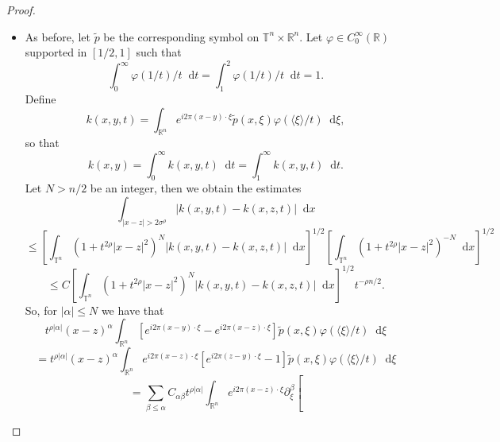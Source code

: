 \documentclass[10pt,a4paper]{amsart}
\newcommand*\diff{\mathop{}\!\mathrm{d}}
\begin{document}
\begin{proof}
\begin{itemize}
        \item[(b)] As before, let $\tilde{p}$ be the corresponding symbol on $\mathbb{T}^n \times \mathbb{R}^n$.  Let $\varphi \in C_0^\infty(\mathbb{R})$ supported in $[1/2, 1]$ such that 
        \begin{equation*}
            \int_0^\infty\varphi(1/t)/t \diff t =\int_1^2\varphi(1/t)/t \diff t = 1.
        \end{equation*} 
        Define 
        \begin{equation*}
            k(x, y, t) = \int_{\mathbb{R}^n} e^{i2\pi(x - y) \cdot \xi} \tilde{p}(x, \xi) \varphi(\langle\xi\rangle/t) \diff \xi,
        \end{equation*}
        so that  
        \begin{equation*}
            k(x, y) = \int_0^\infty k(x, y, t) \diff t = \int_1^\infty k(x, y, t) \diff t.
        \end{equation*}
        Let $N > n/2$ be an integer, then we obtain the estimates
        \begin{equation*}
            \int_{|x-z|>2\sigma^\rho} |k(x, y, t) - k(x, z, t)| \diff x
        \end{equation*}
        \begin{equation*}
            \leq  \left[ \int_{\mathbb{T}^n} (1+t^{2\rho}|x-z|^2)^N |k(x, y, t) - k(x, z, t)| \diff x  \right]^{1/2} \left[ \int_{\mathbb{T}^n} (1+t^{2\rho}|x-z|^2)^{-N} \diff x \right]^{1/2} 
        \end{equation*}
        \begin{equation}
            \leq C\left[ \int_{\mathbb{T}^n} (1+t^{2\rho}|x-z|^2)^N |k(x, y, t) - k(x, z, t)| \diff x  \right]^{1/2}t^{-\rho n/2}.
            \label{eq:firstbound-b}
        \end{equation}
        So, for $|\alpha| \leq N$ we have that
        \begin{equation*}
            t^{\rho|\alpha|}(x-z)^\alpha \int_{\mathbb{R}^n} \left[ e^{i2\pi(x - y) \cdot \xi} - e^{i2\pi(x - z) \cdot \xi} \right]\tilde{p}(x, \xi)\varphi(\langle\xi\rangle/t)\diff \xi 
        \end{equation*}
        \begin{equation*}
            =t^{\rho|\alpha|}(x-z)^\alpha \int_{\mathbb{R}^n} e^{i2\pi(x - z) \cdot \xi} \left[ e^{i2\pi(z - y) \cdot \xi} - 1 \right]\tilde{p}(x, \xi)\varphi(\langle\xi\rangle/t)\diff \xi 
        \end{equation*}
        \begin{equation*}
            =\sum_{\beta\leq\alpha} C_{\alpha\beta} t^{\rho|\alpha|} \int_{\mathbb{R}^n} e^{i2\pi(x - z) \cdot \xi} \partial^\beta_\xi \left[ 

\end{equation*}
\end{itemize}
\end{proof}
\end{document}
